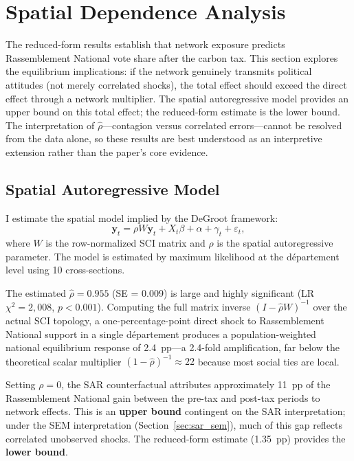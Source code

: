 \documentclass[12pt]{article}
\newcommand{\rn}{Rassemblement National}
\newcommand{\dept}{d\'{e}partement}
\begin{document}

\section{Spatial Dependence Analysis}
\label{sec:structural}
\label{sec:spatial}

The reduced-form results establish that network exposure predicts \rn{} vote share after the carbon tax. This section explores the equilibrium implications: if the network genuinely transmits political attitudes (not merely correlated shocks), the total effect should exceed the direct effect through a network multiplier. The spatial autoregressive model provides an upper bound on this total effect; the reduced-form estimate is the lower bound. The interpretation of $\hat{\rho}$---contagion versus correlated errors---cannot be resolved from the data alone, so these results are best understood as an interpretive extension rather than the paper's core evidence.

\subsection{Spatial Autoregressive Model}

I estimate the spatial model implied by the DeGroot framework:
\begin{equation}
\mathbf{y}_t = \rho W \mathbf{y}_t + X_t \beta + \alpha + \gamma_t + \varepsilon_t,
\label{eq:sar}
\end{equation}
where $W$ is the row-normalized SCI matrix and $\rho$ is the spatial autoregressive parameter. The model is estimated by maximum likelihood at the \dept{} level using 10 cross-sections.

The estimated $\hat{\rho} = 0.955$ (SE = 0.009) is large and highly significant (LR $\chi^2 = 2{,}008$, $p < 0.001$). Computing the full matrix inverse $(I - \hat{\rho} W)^{-1}$ over the actual SCI topology, a one-percentage-point direct shock to \rn{} support in a single \dept{} produces a population-weighted national equilibrium response of 2.4~pp---a 2.4-fold amplification, far below the theoretical scalar multiplier $(1 - \hat{\rho})^{-1} \approx 22$ because most social ties are local.

Setting $\rho = 0$, the SAR counterfactual attributes approximately 11~pp of the \rn{} gain between the pre-tax and post-tax periods to network effects. This is an \textbf{upper bound} contingent on the SAR interpretation; under the SEM interpretation (Section~\ref{sec:sar_sem}), much of this gap reflects correlated unobserved shocks. The reduced-form estimate (1.35~pp) provides the \textbf{lower bound}.
\end{document}
